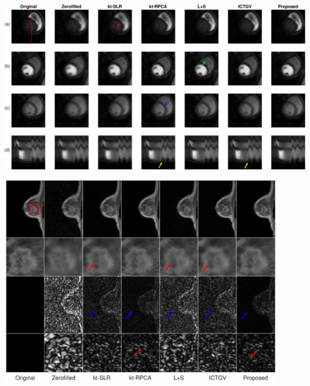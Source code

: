 \documentclass{beamer}
\begin{document}
\begin{frame}
\hspace{-0.6cm}
	\begin{minipage}{1\textwidth}
	\centering
		\includegraphics[width=1.1\textwidth]{../img/tgvnn/figure4_perfusion_frames.eps}
\end{minipage}
\end{frame}

\begin{frame}
\begin{minipage}{1\textwidth}
\centering
\includegraphics[width=0.9\textwidth]{../img/tgvnn/figure5_breast1.eps}
\label{fig:breast1}
\end{minipage} 
\end{frame}
\end{document}
